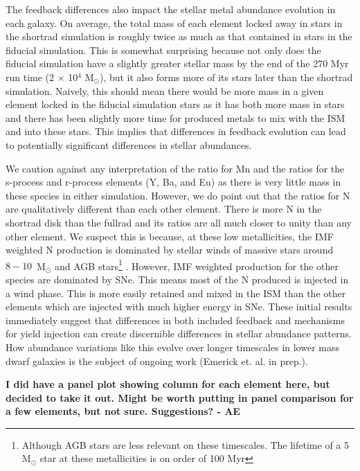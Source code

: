 \documentclass[twocolumn]{aastex61}
\begin{document}
The feedback differences also impact the stellar metal abundance evolution in each galaxy. On average, the total mass of each element locked away in stars in the shortrad simulation is roughly twice as much as that contained in stars in the fiducial simulation. This is somewhat surprising because not only does the fiducial simulation have a slightly greater stellar mass by the end of the 270 Myr run time (2 $\times$ 10$^4$ M$_{\odot}$), but it also forms more of its stars later than the shortrad simulation. Naively, this should mean there would be more mass in a given element locked in the fiducial simulation stars as it has both more mass in stars and there has been slightly more time for produced metals to mix with the ISM and into these stars. This implies that differences in feedback evolution can lead to potentially significant differences in stellar abundances.

We caution against any interpretation of the ratio for Mn and the ratios for the s-process and r-process elements (Y, Ba, and Eu) as there is very little mass in these species in either simulation. However, we do point out that the ratios for N are qualitatively different than each other element. There is more N in the shortrad disk than the fullrad and its ratios are all much closer to unity than any other element. We suspect this is because, at these low metallicities, the IMF weighted N production is dominated by stellar winds of massive stars around $8 - 10$~M$_{\odot}$ and AGB stars\footnote{Although AGB stars are less relevant on these timescales. The lifetime of a 5 M$_{\odot}$ star at these metallicities is on order of 100 Myr} . However, IMF weighted production for the other species are dominated by SNe. This means most of the N produced is injected in a wind phase. This is more easily retained and mixed in the ISM than the other elements which are injected with much higher energy in SNe. These initial results immediately suggest that differences in both included feedback and mechanisms for yield injection can create discernible differences in stellar abundance patterns. How abundance variations like this evolve over longer timescales in lower mass dwarf galaxies is the subject of ongoing work (Emerick et. al. in prep.). 

\textbf{I did have a panel plot showing column for each element here, but decided to take it out. Might be worth putting in panel comparison for a few elements, but not sure. Suggestions? - AE}
\end{document}
